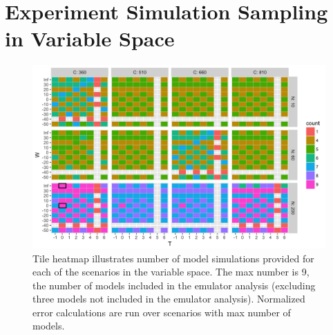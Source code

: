 \documentclass[10pt]{article}
\begin{document}
\\

\vspace{3mm}




\clearpage

\renewcommand{\thefigure}{S\arabic{figure}}


\section{Experiment Simulation Sampling in Variable Space}
\begin{figure}[h!]
\centering
\includegraphics[width=\textwidth]{s_how_many_simulations.png}
\caption{Tile heatmap illustrates number of model simulations provided for each of the scenarios in the variable space. The max number is 9, the number of models included in the emulator analysis (excluding three models not included in the emulator analysis). Normalized error calculations are run over scenarios with max number of models.}
\label{fig:numbersims}
\end{figure}

\clearpage
\end{document}
